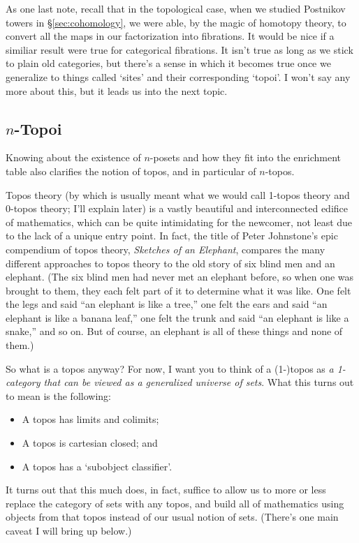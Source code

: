 \documentclass{amsart}
\begin{document}
As one last note, recall that in the topological case, when we studied
Postnikov towers in \S\ref{sec:cohomology}, we were able, by the magic
of homotopy theory, to convert all the maps in our factorization into
fibrations.  It would be nice if a similiar result were true for
categorical fibrations.  It isn't true as long as we stick to plain
old categories, but there's a sense in which it becomes true once we
generalize to things called `sites' and their corresponding `topoi'.
I won't say any more about this, but it leads us into the next topic.


\subsection{$n$-Topoi}
\label{sec:n-topoi}

Knowing about the existence of $n$-posets and how they fit into the
enrichment table also clarifies the notion of topos, and in particular
of $n$-topos.

Topos theory (by which is usually meant what we would call 1-topos
theory and 0-topos theory; I'll explain later) is a vastly beautiful
and interconnected edifice of mathematics, which can be quite
intimidating for the newcomer, not least due to the lack of a unique
entry point.  In fact, the title of Peter Johnstone's epic compendium
of topos theory, {\sl Sketches of an Elephant}, compares the many
different approaches to topos theory to the old story of six blind men
and an elephant.  (The six blind men had never met an elephant before,
so when one was brought to them, they each felt part of it to
determine what it was like.  One felt the legs and said ``an elephant
is like a tree,'' one felt the ears and said ``an elephant is like a
banana leaf,'' one felt the trunk and said ``an elephant is like a
snake,'' and so on.  But of course, an elephant is all of these things
and none of them.)

So what is a topos anyway?  For now, I want you to think of a
(1-)topos as \emph{a 1-category that can be viewed as a generalized
  universe of sets}.  What this turns out to mean is the following:
\begin{itemize}
\item A topos has limits and colimits;
\item A topos is cartesian closed; and
\item A topos has a `subobject classifier'.
\end{itemize}

It turns out that this much does, in fact, suffice to allow us to more
or less replace the category of sets with any topos, and build all of
mathematics using objects from that topos instead of our usual notion
of sets.  (There's one main caveat I will bring up below.)
\end{document}
